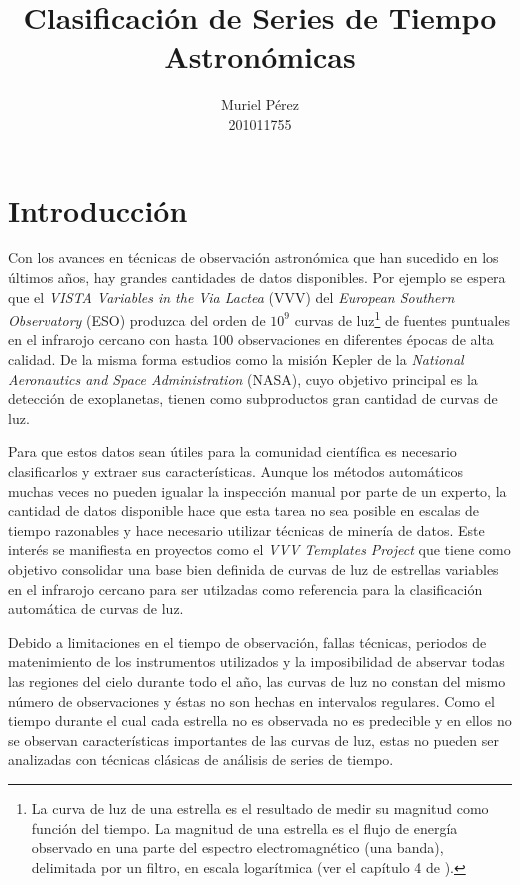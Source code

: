 \documentclass[letterpaper,12pt]{book}
\title{Clasificación de Series de Tiempo Astronómicas}
\author{Muriel Pérez\\ 201011755}
\begin{document}
\maketitle
\tableofcontents 
\chapter{Introducción}

Con los avances en técnicas de observación astronómica que han sucedido en los últimos años, hay grandes cantidades de datos disponibles. Por ejemplo se espera que el \textit{VISTA Variables in the Via Lactea} (VVV) del \textit{European Southern Observatory} (ESO) produzca del orden de $10^{9}$ curvas de luz\footnote{\label{nota:curvasDeLuz} La curva de luz de una estrella es el resultado de medir su magnitud como función del tiempo. La magnitud de una estrella es el flujo de energía observado en una parte del espectro electromagnético (una banda), delimitada por un filtro, en escala logarítmica (ver el capítulo 4 de \cite{karttunen_fundamental_2007}).} de fuentes puntuales en el infrarojo cercano con hasta 100 observaciones en diferentes épocas de alta calidad. De la misma forma estudios como la misión Kepler de la \textit{National Aeronautics and Space Administration} (NASA), cuyo objetivo principal es la detección de exoplanetas,  tienen como subproductos gran cantidad de curvas  de luz. 

Para que estos datos sean útiles para la comunidad científica es necesario clasificarlos y extraer sus características. Aunque los métodos automáticos muchas veces no pueden igualar la inspección manual por parte de un experto, la cantidad de datos disponible hace que esta tarea no sea posible en escalas de tiempo razonables y hace necesario utilizar técnicas de minería de datos. Este interés se manifiesta en proyectos como el \textit{VVV Templates Project} que tiene como objetivo consolidar una base bien definida de curvas de luz de estrellas variables en el infrarojo cercano para ser utilzadas como referencia para la clasificación automática de curvas de luz.


Debido a limitaciones en el tiempo de observación, fallas técnicas, periodos de matenimiento de los instrumentos utilizados y la imposibilidad de abservar todas las regiones del cielo durante todo el año, las curvas de luz no constan del mismo número de observaciones y éstas no son hechas en intervalos regulares. Como el tiempo durante el cual cada estrella no es observada no es predecible y en ellos no se observan características importantes de las curvas de luz,  estas no pueden ser analizadas con técnicas clásicas de análisis de series de tiempo.
\end{document}
